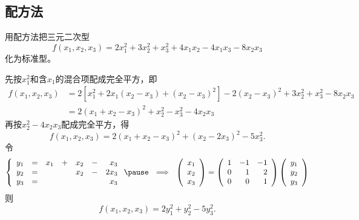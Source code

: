 \subsection{配方法}


\begin{frame}
  
    \begin{li}
      用配方法把三元二次型
      $$
      f(x_1,x_2,x_3)=2x_1^2+3x_2^2+x_3^2+4x_1x_2-4x_1x_3-8x_2x_3
      $$
      化为标准型。
    \end{li}
    \pause
    \begin{jie}
    先按$x_1^2$和含$x_1$的混合项配成完全平方，即
    $$
    \begin{array}{rl}
      f(x_1,x_2,x_3)&=2[x_1^2+2x_1(x_2-x_3)+(x_2-x_3)^2]-2(x_2-x_3)^2+3x_2^2+x_3^2-8x_2x_3\\[0.1in]
      &=2(x_1+x_2-x_3)^2+x_2^2-x_3^2-4x_2x_3
    \end{array}
    $$\pause
    再按$x_2^2-4x_2x_3$配成完全平方，得
    $$
    f(x_1,x_2,x_3)=2(x_1+x_2-x_3)^2+(x_2-2x_3)^2-5x_3^2.
    $$
    \pause
    令
    $$
    \left\{
    \begin{array}{rcrcrcr}
      y_1&=&x_1&+&x_2&-&x_3\\
      y_2&=& &&x_2&-&2x_3\\
      y_3&=&&&&&x_3
    \end{array}
    \right. \pause ~~\Longrightarrow~~
    \left(
    \begin{array}{c}
      x_1\\
      x_2\\
      x_3
    \end{array}
    \right)=
    \left(
    \begin{array}{rrr}
      1&-1&-1\\
      0&1&2\\
      0&0&1
    \end{array}
    \right)
    \left(
    \begin{array}{c}
      y_1\\
      y_2\\
      y_3
    \end{array}
    \right)
    $$ \pause 
    则
    $$
    f(x_1,x_2,x_3)=2y_1^2+y_2^2-5y_3^2.
    $$
  \end{jie}
\end{frame}


